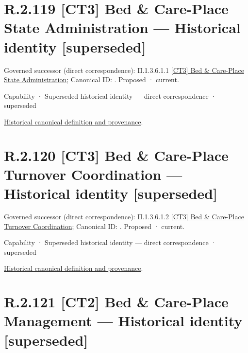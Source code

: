 \section*{R.2.119 [CT3] Bed \& Care-Place State Administration — Historical identity [superseded]}
\label{navigation:R.2.119}

{\small Governed successor (direct correspondence): II.1.3.6.1.1 \hyperref[element:26a9383d7bb146a19141558d232843de]{[CT3] Bed \& Care-Place State Administration}; Canonical ID: \texttt{}. Proposed · current.}\par
\label{element:dd2e2ee1a68845c087ba93610752181b}
{\small Capability · Superseded historical identity — direct correspondence · superseded}\par
\href{../../../../../../../continuum/strategy/capability/dd2e2ee1a68845c087ba93610752181b.md}{Historical canonical definition and provenance}.\par
\section*{R.2.120 [CT3] Bed \& Care-Place Turnover Coordination — Historical identity [superseded]}
\label{navigation:R.2.120}

{\small Governed successor (direct correspondence): II.1.3.6.1.2 \hyperref[element:3c9464f9eae1415d8fa041bd1f3da4f2]{[CT3] Bed \& Care-Place Turnover Coordination}; Canonical ID: \texttt{}. Proposed · current.}\par
\label{element:a50662edda954bc58c44184d84591d5b}
{\small Capability · Superseded historical identity — direct correspondence · superseded}\par
\href{../../../../../../../continuum/strategy/capability/a50662edda954bc58c44184d84591d5b.md}{Historical canonical definition and provenance}.\par
\section*{R.2.121 [CT2] Bed \& Care-Place Management — Historical identity [superseded]}
\label{navigation:R.2.121}

